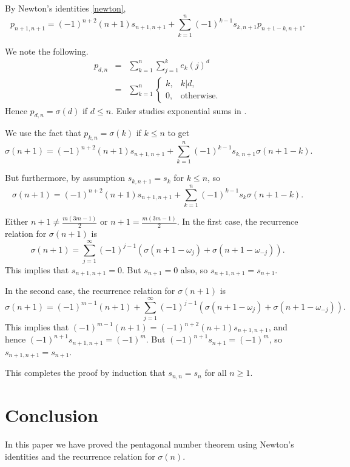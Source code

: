 \documentclass{article}
\begin{document}
By Newton's identities \eqref{newton},
\[
p_{n+1,n+1}=(-1)^{n+2}(n+1)s_{n+1,n+1}
+\sum_{k=1}^n (-1)^{k-1} s_{k,n+1}p_{n+1-k,n+1}.
\]

We note the following.
\begin{eqnarray*}
p_{d,n}&=&\sum_{k=1}^n \sum_{j=1}^k e_k(j)^d\\
&=&\sum_{k=1}^n \begin{cases}
k,&k|d,\\
0,&\textrm{otherwise}.
\end{cases}
\end{eqnarray*}
Hence $p_{d,n}=\sigma(d)$ if $d \leq n$.
Euler studies exponential sums in \cite{E447}.

We use the fact that $p_{k,n}=\sigma(k)$ if $k \leq n$ to get
\[
\sigma(n+1)=
(-1)^{n+2}(n+1)s_{n+1,n+1}
+\sum_{k=1}^n (-1)^{k-1} s_{k,n+1}\sigma(n+1-k).
\]

But furthermore, by assumption $s_{k,n+1}=s_k$ for $k \leq n$, so
\[
\sigma(n+1)=(-1)^{n+2}(n+1)s_{n+1,n+1}
+\sum_{k=1}^n (-1)^{k-1} s_k\sigma(n+1-k).
\]

Either $n+1 \neq \frac{m(3m-1)}{2}$ or $n+1=\frac{m(3m-1)}{2}$.
In the first case, the recurrence relation for $\sigma(n+1)$ is
\[
\sigma(n+1)=\sum_{j=1}^\infty (-1)^{j-1}(\sigma(n+1-\omega_j)
+\sigma(n+1-\omega_{-j})).
\]
This implies that $s_{n+1,n+1}=0$. But $s_{n+1}=0$ also, so $s_{n+1,n+1}=s_{n+1}$.

In the second case, the recurrence relation for $\sigma(n+1)$ is
\[
\sigma(n+1)=(-1)^{m-1}(n+1)
+\sum_{j=1}^\infty (-1)^{j-1}(\sigma(n+1-\omega_j)+\sigma(n+1-\omega_{-j})).
\]
This implies that $(-1)^{m-1}(n+1)=(-1)^{n+2}(n+1)s_{n+1,n+1}$, and hence
$(-1)^{n+1}s_{n+1,n+1}=(-1)^m$. But $(-1)^{n+1}s_{n+1}=(-1)^m$, so
$s_{n+1,n+1}=s_{n+1}$.

This completes the proof by induction that $s_{n,n}=s_n$ for all $n \geq 1$.

\section{Conclusion}
In this paper we have proved the pentagonal number theorem using
Newton's identities and the recurrence relation for $\sigma(n)$. 



\end{document}
